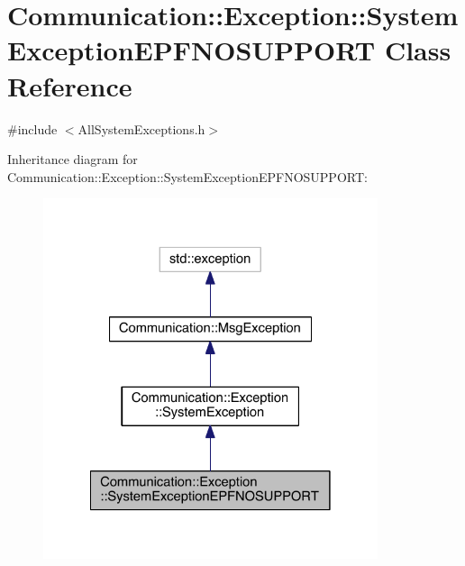 \hypertarget{class_communication_1_1_exception_1_1_system_exception_e_p_f_n_o_s_u_p_p_o_r_t}{}\section{Communication\+:\+:Exception\+:\+:System\+Exception\+E\+P\+F\+N\+O\+S\+U\+P\+P\+O\+R\+T Class Reference}
\label{class_communication_1_1_exception_1_1_system_exception_e_p_f_n_o_s_u_p_p_o_r_t}


{\ttfamily \#include $<$All\+System\+Exceptions.\+h$>$}



Inheritance diagram for Communication\+:\+:Exception\+:\+:System\+Exception\+E\+P\+F\+N\+O\+S\+U\+P\+P\+O\+R\+T\+:\nopagebreak
\begin{figure}[H]
\begin{center}
\leavevmode
\includegraphics[width=278pt]{class_communication_1_1_exception_1_1_system_exception_e_p_f_n_o_s_u_p_p_o_r_t__inherit__graph}
\end{center}
\end{figure}


